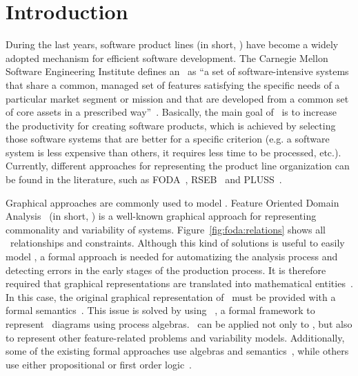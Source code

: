 \section{Introduction}
\label{ref:introduction}


During the last years, software product lines (in short, \SPLs) have become a widely adopted mechanism for efficient software development. The Carnegie Mellon Software Engineering Institute defines an \SPL\ as ``a set of software-intensive systems that share a common, managed set of features satisfying the specific needs of a particular market segment or mission and that are developed from a common set of core assets in a prescribed way''~\cite{mcg01}. Basically, the main goal of \SPLs\ is to increase the productivity for creating software products, which is achieved by selecting those software systems that are better for a specific criterion (e.g. a software system is less expensive than others, it requires less time to be processed, etc.). Currently, different approaches for representing the product line organization can be found in the literature, such as FODA~\cite{kchnp90},
RSEB~\cite{mj98} and PLUSS~\cite{k05,ebb06}.

Graphical approaches are commonly used to model \SPLs. Feature Oriented Domain Analysis~\cite{kchnp90} (in short, \FODA) is a well-known graphical approach for representing commonality and variability of systems. Figure~\ref{fig:foda:relations} shows all \FODA\ relationships and constraints.
Although this kind of solutions is useful to easily model \SPLs, a formal approach is needed for automatizing the analysis process and detecting errors in the early stages of the production process. It is therefore required that graphical representations are translated into mathematical entities~\cite{nak10}. In this case, the original graphical representation of \FODA\ must be provided with a formal semantics~\cite{bhst04}.
%
This  issue is solved by using \fodaPA~\cite{acl13}, a formal framework to represent \FODA\ diagrams using process algebras. \fodaPA\ can be applied not only to \FODA, but also to represent other feature-related problems and variability models. Additionally, some of the existing formal approaches use algebras and semantics~\cite{szw05,kkm06,prb11,acl13}, while others use either propositional or first order logic~\cite{man02,ka07,abgf10,atfg10,nnz14}.

